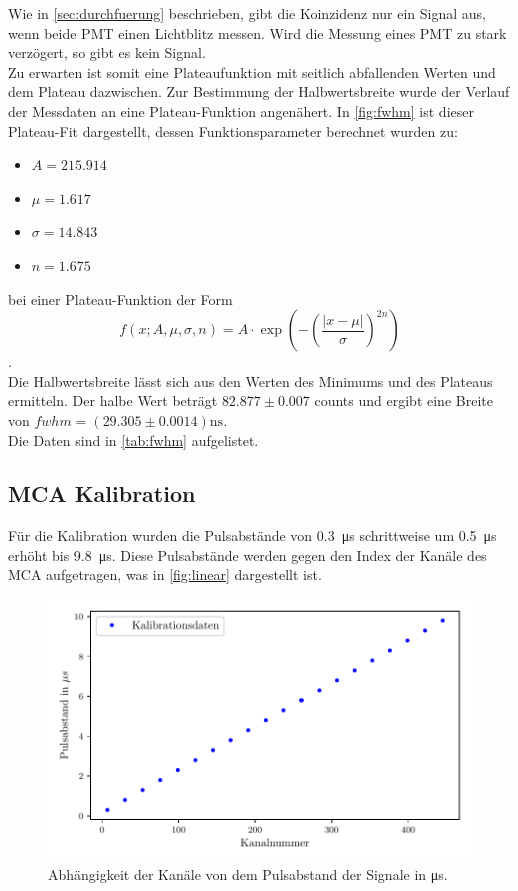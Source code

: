 Wie in \autoref{sec:durchfuerung} beschrieben, gibt die Koinzidenz nur ein Signal aus, wenn beide PMT einen Lichtblitz messen.
Wird die Messung eines PMT zu stark verzögert, so gibt es kein Signal.\\
Zu erwarten ist somit eine Plateaufunktion mit seitlich abfallenden Werten und dem Plateau dazwischen.
Zur Bestimmung der Halbwertsbreite wurde der Verlauf der Messdaten an eine Plateau-Funktion angenähert.
In \autoref{fig:fwhm} ist dieser Plateau-Fit dargestellt, dessen Funktionsparameter berechnet wurden zu:
\begin{itemize}
    \item $A = 215.914$
    \item $\mu = 1.617$
    \item $\sigma = 14.843$
    \item $n = 1.675$
\end{itemize}
bei einer Plateau-Funktion der Form
\begin{equation}
    f(x;A,\mu,\sigma, n) = A\cdot \exp\left(-\left(\frac{\left|x - \mu\right|}{\sigma}\right)^{2n}\right)
\end{equation}.\\
Die Halbwertsbreite lässt sich aus den Werten des Minimums und des Plateaus ermitteln.
Der halbe Wert beträgt $82.877\pm0.007$ counts und ergibt eine Breite von $fwhm = \left(29.305\pm0.0014\right)\si{\nano\second}$.\\
Die Daten sind in \autoref{tab:fwhm} aufgelistet.

\subsection{MCA Kalibration}
\label{sec:calli}
Für die Kalibration wurden die Pulsabstände von \SI{0.3}{\micro\second} schrittweise um \SI{0.5}{\micro\second} erhöht bis \SI{9.8}{\micro\second}.
Diese Pulsabstände werden gegen den Index der Kanäle des MCA aufgetragen, was in \autoref{fig:linear} dargestellt ist.

\begin{figure}[H]
    \centering
    \includegraphics{images/linear.pdf}
    \caption{Abhängigkeit der Kanäle von dem Pulsabstand der Signale in \si[]{\micro\second}.}
    \label{fig:linear}
\end{figure}


